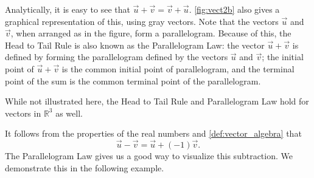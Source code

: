 
Analytically, it is easy to see that $\vec u+\vec v = \vec v+\vec u$. \autoref{fig:vect2b} also gives a graphical representation of this, using gray vectors. Note that the vectors $\vec u$ and $\vec v$, when arranged as in the figure, form a parallelogram. Because of this, the Head to Tail Rule is also known as the Parallelogram Law: the vector $\vec u+\vec v$ is defined by forming the parallelogram defined by the vectors $\vec u$ and $\vec v$; the initial point of $\vec u+\vec v$ is the common initial point of parallelogram, and the terminal point of the sum is the common terminal point of the parallelogram.

While not illustrated here, the Head to Tail Rule and Parallelogram Law hold for vectors in $\mathbb{R}^3$ as well.

It follows from the properties of the real numbers and \autoref{def:vector_algebra} that
\[\vec u-\vec v = \vec u + (-1)\vec v.\]
The Parallelogram Law gives us a good way to visualize this subtraction. We demonstrate this in the following example.\\

